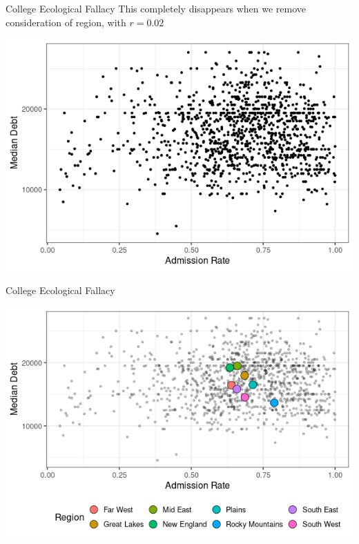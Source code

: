 \documentclass{beamer}
\begin{document}
\begin{frame}{College Ecological Fallacy}
\footnotesize
This completely disappears when we remove consideration of region, with $r = 0.02$
\begin{center}
\includegraphics[scale=0.5]{cc_all.png}
\end{center}
\end{frame}

\begin{frame}{College Ecological Fallacy}

\begin{center}
\includegraphics[scale=0.5]{cc_all2.png}
\end{center}
\end{frame}
\end{document}
